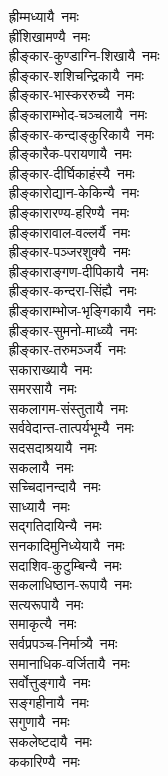\begin{multicols}{2}
\begin{flushleft}
ह्रीम्मध्यायै~नमः\\
ह्रींशिखामण्यै~नमः\\
ह्रीङ्कार-कुण्डाग्नि-शिखायै~नमः\\
ह्रीङ्कार-शशिचन्द्रिकायै~नमः\\
ह्रीङ्कार-भास्कररुच्यै~नमः\\
ह्रीङ्काराम्भोद-चञ्चलायै~नमः\\
ह्रीङ्कार-कन्दाङ्कुरिकायै~नमः\\
ह्रीङ्कारैक-परायणायै~नमः\hfill {}\\
ह्रीङ्कार-दीर्घिकाहंस्यै~नमः\\
ह्रीङ्कारोद्यान-केकिन्यै~नमः\\
ह्रीङ्कारारण्य-हरिण्यै~नमः\\
ह्रीङ्कारावाल-वल्लर्यै~नमः\\
ह्रीङ्कार-पञ्जरशुक्यै~नमः\\
ह्रीङ्काराङ्गण-दीपिकायै~नमः\\
ह्रीङ्कार-कन्दरा-सिंह्यै~नमः\\
ह्रीङ्काराम्भोज-भृङ्गिकायै~नमः\\
ह्रीङ्कार-सुमनो-माध्व्यै~नमः\\
ह्रीङ्कार-तरुमञ्जर्यै~नमः\hfill {}\\
सकाराख्यायै~नमः\\
समरसायै~नमः\\
सकलागम-संस्तुतायै~नमः\\
सर्ववेदान्त-तात्पर्यभूम्यै~नमः\\
सदसदाश्रयायै~नमः\\
सकलायै~नमः\\
सच्चिदानन्दायै~नमः\\
साध्यायै~नमः\\
सद्गतिदायिन्यै~नमः\\
सनकादिमुनिध्येयायै~नमः\hfill {}\\
सदाशिव-कुटुम्बिन्यै~नमः\\
सकलाधिष्ठान-रूपायै~नमः\\
सत्यरूपायै~नमः\\
समाकृत्यै~नमः\\
सर्वप्रपञ्च-निर्मात्र्यै~नमः\\
समानाधिक-वर्जितायै~नमः\\
सर्वोत्तुङ्गायै~नमः\\
सङ्गहीनायै~नमः\\
सगुणायै~नमः\\
सकलेष्टदायै~नमः\hfill {}\\
ककारिण्यै~नमः\\

\end{flushleft}
\end{multicols}
